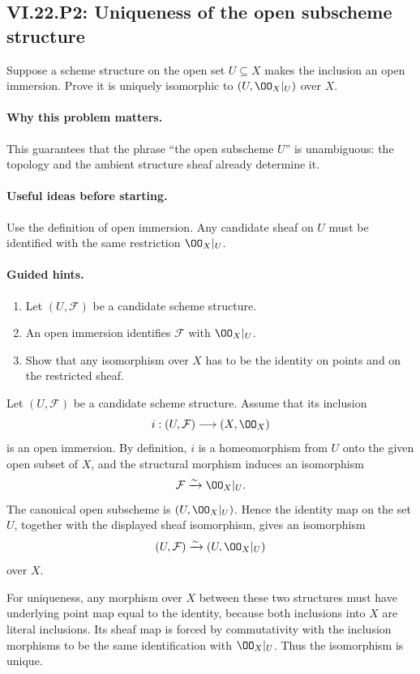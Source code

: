 \subsection*{VI.22.P2: Uniqueness of the open subscheme structure}
\begin{problem}\label{prob:vi22-p02}
Suppose a scheme structure on the open set $U\subseteq X$ makes the inclusion an open immersion.  Prove it is uniquely isomorphic to $(U,\OO_X|_U)$ over $X$.
\end{problem}

\ifdefined\FullProblemDossiers
\paragraph{Why this problem matters.}
This guarantees that the phrase ``the open subscheme $U$'' is unambiguous: the topology and the ambient structure sheaf already determine it.

\paragraph{Useful ideas before starting.}
Use the definition of open immersion.  Any candidate sheaf on $U$ must be identified with the same restriction $\OO_X|_U$.

\paragraph{Guided hints.}
\begin{enumerate}
\item Let $(U,\mathcal F)$ be a candidate scheme structure.
\item An open immersion identifies $\mathcal F$ with $\OO_X|_U$.
\item Show that any isomorphism over $X$ has to be the identity on points and on the restricted sheaf.
\end{enumerate}

\begin{solution}
Let $(U,\mathcal F)$ be a candidate scheme structure.  Assume that its inclusion
\[
 i:(U,\mathcal F)\longrightarrow(X,\OO_X)
\]
is an open immersion.  By definition, $i$ is a homeomorphism from $U$ onto the given open
subset of $X$, and the structural morphism induces an isomorphism
\[
 \mathcal F\xrightarrow{\sim}\OO_X|_U.
\]
The canonical open subscheme is $(U,\OO_X|_U)$.  Hence the identity map on the set $U$,
together with the displayed sheaf isomorphism, gives an isomorphism
\[
 (U,\mathcal F)\xrightarrow{\sim}(U,\OO_X|_U)
\]
over $X$.

For uniqueness, any morphism over $X$ between these two structures must have underlying point
map equal to the identity, because both inclusions into $X$ are literal inclusions.  Its sheaf
map is forced by commutativity with the inclusion morphisms to be the same identification with
$\OO_X|_U$.  Thus the isomorphism is unique.
\end{solution}

